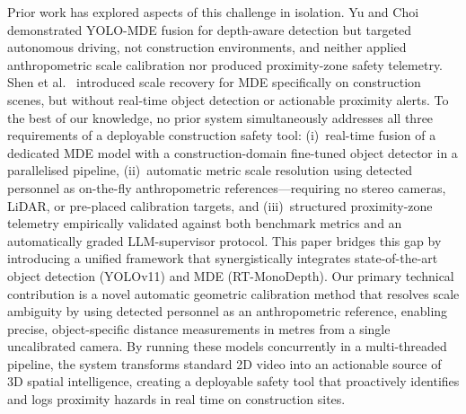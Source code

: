 \documentclass{article}
\begin{document}
Prior work has explored aspects of this challenge in isolation. Yu and Choi \cite{yu2021} demonstrated YOLO-MDE fusion for depth-aware detection but targeted autonomous driving, not construction environments, and neither applied anthropometric scale calibration nor produced proximity-zone safety telemetry. Shen et al.\ \cite{shen2023} introduced scale recovery for MDE specifically on construction scenes, but without real-time object detection or actionable proximity alerts. To the best of our knowledge, no prior system simultaneously addresses all three requirements of a deployable construction safety tool: (i)~real-time fusion of a dedicated MDE model with a construction-domain fine-tuned object detector in a parallelised pipeline, (ii)~automatic metric scale resolution using detected personnel as on-the-fly anthropometric references---requiring no stereo cameras, LiDAR, or pre-placed calibration targets, and (iii)~structured proximity-zone telemetry empirically validated against both benchmark metrics and an automatically graded LLM-supervisor protocol. This paper bridges this gap by introducing a unified framework that synergistically integrates state-of-the-art object detection (YOLOv11) and MDE (RT-MonoDepth). Our primary technical contribution is a novel automatic geometric calibration method that resolves scale ambiguity by using detected personnel as an anthropometric reference, enabling precise, object-specific distance measurements in metres from a single uncalibrated camera. By running these models concurrently in a multi-threaded pipeline, the system transforms standard 2D video into an actionable source of 3D spatial intelligence, creating a deployable safety tool that proactively identifies and logs proximity hazards in real time on construction sites.
\end{document}
